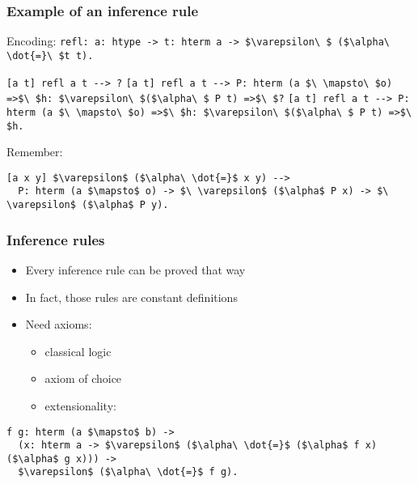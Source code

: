 \begin{frame}[fragile]
\frametitle{Example of an inference rule}

\begin{mathpar}
\end{mathpar}

\begin{block}{Encoding:}
\lstinline!refl: a: htype -> t: hterm a -> $\varepsilon\ $ ($\alpha\ \dot{=}\ $t t).!

\begin{overprint}
\lstinline![a t] refl a t --> ?!
\lstinline![a t] refl a t --> P: hterm (a $\ \mapsto\ $o) =>$\ $h: $\varepsilon\ $($\alpha\ $ P t) =>$\ $?!
\lstinline![a t] refl a t --> P: hterm (a $\ \mapsto\ $o) =>$\ $h: $\varepsilon\ $($\alpha\ $ P t) =>$\ $h.!
\end{overprint}
\end{block}

\begin{block}{Remember:}
\begin{lstlisting}
[a x y] $\varepsilon$ ($\alpha\ \dot{=}$ x y) -->
  P: hterm (a $\mapsto$ o) -> $\ \varepsilon$ ($\alpha$ P x) -> $\ \varepsilon$ ($\alpha$ P y).
\end{lstlisting}
\end{block}

\end{frame}


\begin{frame}[fragile]
\frametitle{Inference rules}

\begin{itemize}
\item Every inference rule can be proved that way
\item In fact, those rules are \alert{constant definitions}
\item Need axioms:
  \begin{itemize}
  \item classical logic
  \item axiom of choice
  \item extensionality:
  \end{itemize}
\end{itemize}

\begin{lstlisting}
f g: hterm (a $\mapsto$ b) ->
  (x: hterm a -> $\varepsilon$ ($\alpha\ \dot{=}$ ($\alpha$ f x) ($\alpha$ g x))) ->
  $\varepsilon$ ($\alpha\ \dot{=}$ f g).
\end{lstlisting}

\end{frame}


